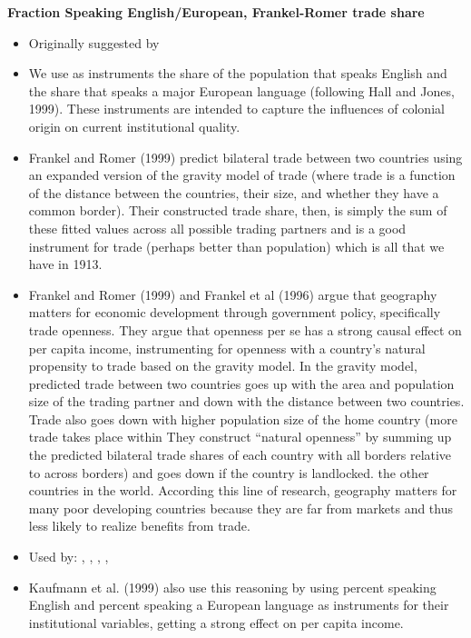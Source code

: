 \noindent \textbf{Fraction Speaking English/European, Frankel-Romer trade share}

\begin{itemize}
    \item Originally suggested by \citet{hj}
    \item We use as instruments the share of the population that speaks English and the share that speaks a major European language (following Hall and Jones, 1999). These instruments are intended to capture the influences of colonial origin on current institutional quality.
    \item Frankel and Romer (1999) predict bilateral trade between two countries using an expanded version of the gravity model of trade (where trade is a function of the distance between the countries, their size, and whether they have a common border). Their constructed trade share, then, is simply the sum of these fitted values across all possible trading partners and is a good instrument for trade (perhaps better than population) which is all that we have in 1913.
    \item Frankel and Romer (1999) and Frankel et al (1996) argue that geography matters for economic development through government policy, specifically trade openness. They argue that openness per se has a strong causal effect on per capita income, instrumenting for openness with a country’s natural propensity to trade based on the gravity model. In the gravity model, predicted trade between two countries goes up with the area and population size of the trading partner and down with the distance between two countries. Trade also goes down with higher population size of the home country (more trade takes place within They construct “natural openness” by summing up the predicted bilateral trade shares of each country with all
borders relative to across borders) and goes down if the country is landlocked.
the other countries in the world. According this line of research, geography matters for many poor developing countries because they are far from markets and thus less likely to realize benefits from trade.
    \item Used by: \citet{rajan}, \citet{econ-constitution}, \citet{boschini2004resource}, \citet{dollar}, \citet{kaufmann1999governance}
    \item Kaufmann et al. (1999) also use this reasoning by using percent speaking English and percent speaking a European language as instruments for their institutional variables, getting a strong effect on per capita income.
\end{itemize}


